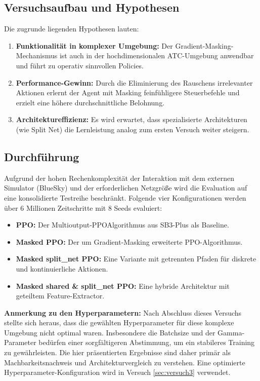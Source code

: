 \subsection{Versuchsaufbau und Hypothesen}
Die zugrunde liegenden Hypothesen lauten:
\begin{enumerate}
    \item \label{hyp:atc_functionality} \textbf{Funktionalität in komplexer Umgebung:} Der Gradient\hyp{}Masking\hyp{}Mechanismus ist auch in der hochdimensionalen ATC-Umgebung anwendbar und führt zu operativ sinnvollen Policies.
    \item \label{hyp:atc_performance} \textbf{Performance-Gewinn:} Durch die Eliminierung des Rauschens irrelevanter Aktionen erlernt der Agent mit Masking feinfühligere Steuerbefehle und erzielt eine höhere durchschnittliche Belohnung.
    \item \label{hyp:atc_architecture} \textbf{Archi\-tek\-tur\-effi\-zi\-enz:} Es wird erwartet, dass spezialisierte Architekturen (wie Split Net) die Lernleistung analog zum ersten Versuch weiter steigern.
\end{enumerate}

\subsection{Durchführung}

Aufgrund der hohen Rechenkomplexität der Interaktion mit dem externen Simulator (BlueSky) und der erforderlichen Netzgröße wird die Evaluation auf eine konsolidierte Testreihe beschränkt.
Folgende vier Konfigurationen werden über 6 Millionen Zeitschritte mit 8 Seeds evaluiert:
\begin{itemize}
    \item \textbf{\ac{PPO}:} Der Multioutput-\acs{PPO}Algorithmus aus \ac{SB3}-Plus \cite{sb3_plus} als Baseline.
    \item \textbf{Masked \ac{PPO}:} Der um Gradient\hyp{}Masking erweiterte \ac{PPO}-Algorithmus.
    \item \textbf{Masked split\_net \ac{PPO}:} Eine Variante mit getrennten Pfaden für diskrete und kontinuierliche Aktionen.
    \item \textbf{Masked shared \& split\_net \ac{PPO}:} Eine hybride Architektur mit geteiltem Feature-Extractor.
\end{itemize}

\textbf{Anmerkung zu den Hyperparametern:} Nach Abschluss dieses Versuchs stellte sich heraus, dass die gewählten Hyperparameter für diese komplexe Umgebung nicht optimal waren. Insbesondere die Batchsize und der Gamma-Parameter bedürfen einer sorgfältigeren Abstimmung, um ein stabileres Training zu gewährleisten. Die hier präsentierten Ergebnisse sind daher primär als Machbarkeitsnachweis und Architekturvergleich zu verstehen. Eine optimierte Hyperparameter-Konfiguration wird in Versuch \ref{sec:versuch3} verwendet.

